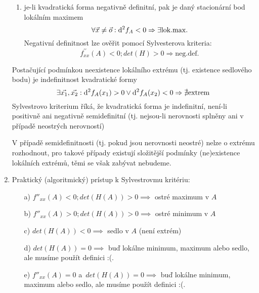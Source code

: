 \begin{enumerate}
\begin{enumerate}
\item je-li kvadratická forma negativně definitní, pak je daný stacionární bod lokálním maximem
$$
\forall \vec{x} \neq \vec{o} :
\mathrm{d}^2f_A < 0 
\Rightarrow \exists \mathrm{lok.max.}
$$
Negativní definitnost lze ověřit pomocí Sylvesterova kriteria: 
$$
f^{\prime\prime}_{xx}(A) < 0; det(H) > 0
\Rightarrow \mathrm{neg.def.}
$$

\end{enumerate}
Postačující podmínkou neexistence lokálního extrému (tj. existence sedlového bodu) je indefinitnost kvadratické formy
$$
\exists \vec{x_1},\vec{x_2} :
\mathrm{d}^2f_A(x_1) > 0  \vee \mathrm{d}^2f_A(x_2) < 0 
\Rightarrow \nexists \mathrm{extrem}
$$
Sylvestrovo kriterium říká, že kvadratická forma je indefinitní, není-li positivně ani negativně semidefinitní (tj. nejsou-li nerovnosti splněny ani v případě neostrých nerovností)

V případě semidefinitnosti (tj. pokud jsou nerovnosti neostré) nelze o extrému rozhodnout, pro takové případy existují složitější podmínky (ne)existence lokálních extrémů, těmi se však zabývat nebudeme.


\item Praktický (algoritmický) prístup k Sylvestrovmu kritériu:
\begin{enumerate}
    \item[a)] $f''_{xx}(A) < 0; det(H(A)) > 0 \implies $ ostré maximum v $A$
    \item[b)] $f''_{xx}(A) > 0; det(H(A)) > 0 \implies $ ostré minimum v $A$
    \item[c)] $det(H(A)) < 0 \implies $ sedlo v $A$ (není extrém)
    \item[d)] $det(H(A)) = 0 \implies $ buď lokálne minimum, maximum alebo sedlo, ale musíme použít definici :(.
    \item[e)] $f''_{xx}(A)=0$ a~$det(H(A)) = 0 \implies $ buď lokálne minimum, maximum alebo sedlo, ale musíme použít definici :(.
    
\end{enumerate}


\end{enumerate}
